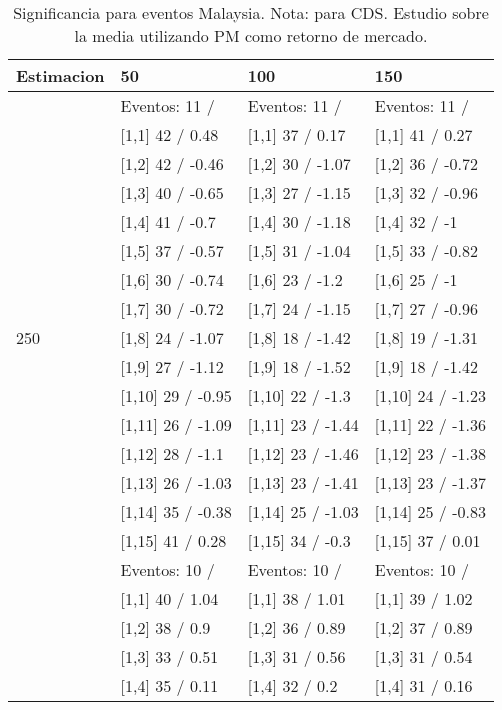 \begin{table}

\caption{Significancia para eventos Malaysia. Nota: para CDS. Estudio sobre la media utilizando PM como retorno de mercado.}
\centering
\begin{tabular}[t]{llll}
\toprule
Estimacion & 50 & 100 & 150\\
\midrule
 & Eventos:  11 / & Eventos:  11 / & Eventos:  11 /\\
 & {}[1,1] 42  / 0.48 & {}[1,1] 37  / 0.17 & {}[1,1] 41  / 0.27\\
 & {}[1,2] 42  / -0.46 & {}[1,2] 30  / -1.07 & {}[1,2] 36  / -0.72\\
 & {}[1,3] 40  / -0.65 & {}[1,3] 27  / -1.15 & {}[1,3] 32  / -0.96\\
 & {}[1,4] 41  / -0.7 & {}[1,4] 30  / -1.18 & {}[1,4] 32  / -1\\
\addlinespace
 & {}[1,5] 37  / -0.57 & {}[1,5] 31  / -1.04 & {}[1,5] 33  / -0.82\\
 & {}[1,6] 30  / -0.74 & {}[1,6] 23  / -1.2 & {}[1,6] 25  / -1\\
 & {}[1,7] 30  / -0.72 & {}[1,7] 24  / -1.15 & {}[1,7] 27  / -0.96\\
250 & {}[1,8] 24  / -1.07 & {}[1,8] 18  / -1.42 & {}[1,8] 19  / -1.31\\
 & {}[1,9] 27  / -1.12 & {}[1,9] 18  / -1.52 & {}[1,9] 18  / -1.42\\
\addlinespace
 & {}[1,10] 29  / -0.95 & {}[1,10] 22  / -1.3 & {}[1,10] 24  / -1.23\\
 & {}[1,11] 26  / -1.09 & {}[1,11] 23  / -1.44 & {}[1,11] 22  / -1.36\\
 & {}[1,12] 28  / -1.1 & {}[1,12] 23  / -1.46 & {}[1,12] 23  / -1.38\\
 & {}[1,13] 26  / -1.03 & {}[1,13] 23  / -1.41 & {}[1,13] 23  / -1.37\\
 & {}[1,14] 35  / -0.38 & {}[1,14] 25  / -1.03 & {}[1,14] 25  / -0.83\\
\addlinespace
 & {}[1,15] 41  / 0.28 & {}[1,15] 34  / -0.3 & {}[1,15] 37  / 0.01\\
 & Eventos:  10 / & Eventos:  10 / & Eventos:  10 /\\
 & {}[1,1] 40  / 1.04 & {}[1,1] 38  / 1.01 & {}[1,1] 39  / 1.02\\
 & {}[1,2] 38  / 0.9 & {}[1,2] 36  / 0.89 & {}[1,2] 37  / 0.89\\
 & {}[1,3] 33  / 0.51 & {}[1,3] 31  / 0.56 & {}[1,3] 31  / 0.54\\
\addlinespace
 & {}[1,4] 35  / 0.11 & {}[1,4] 32  / 0.2 & {}[1,4] 31  / 0.16\\

\end{tabular}
\end{table}
